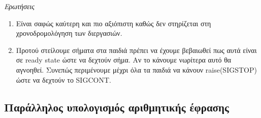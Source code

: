 \documentclass[a4paper,10pt]{article} \usepackage{anysize}
\begin{document}
\inputminted[linenos,fontsize=\footnotesize,frame=leftline]{c}{files/ask2-signals.c}
\emph{Ερωτήσεις}
\begin{enumerate}
\item Είναι σαφώς καύτερη και πιο αξιόπιστη καθώς δεν στηρίζεται στη
χρονοδρομολόγηση των διεργασιών.
\item Προτού στείλουμε σήματα στα παιδιά πρέπει να έχουμε βεβαιωθεί πως αυτά
είναι σε ready state ώστε να δεχτούν σήμα. Αν το κάνουμε νωρίτερα αυτό θα
αγνοηθεί. Συνεπώς περιμένουμε μέχρι όλα τα παιδιά να κάνουν raise(SIGSTOP)
ώστε να δεχτούν το SIGCONT.
\end{enumerate}

\subsection{Παράλληλος υπολογισμός αριθμητικής έφρασης}
\inputminted[linenos,fontsize=\footnotesize,frame=leftline]{c}{files/ask2-pipes.c}
\end{document}
